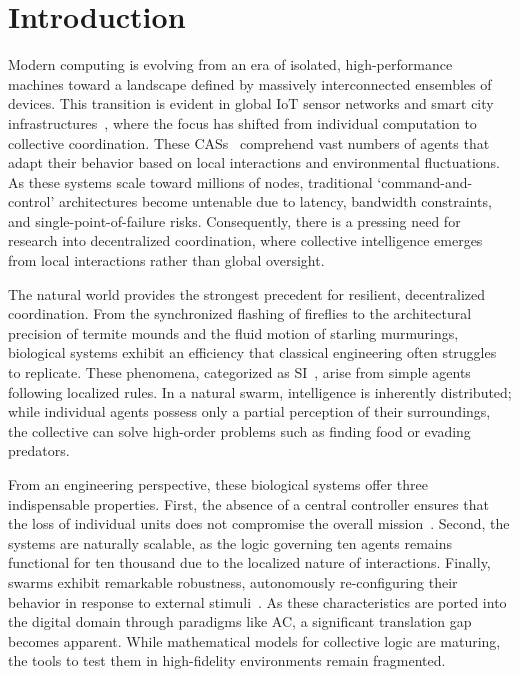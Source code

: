 \chapter{Introduction}

Modern computing is evolving from an era of isolated, high-performance machines toward a landscape defined by massively interconnected ensembles of devices. This transition is evident in global \ac{IoT} sensor networks and smart city infrastructures~\cite{DBLP:journals/internet/AguzziCPV22}, where the focus has shifted from individual computation to collective coordination. These \aclp{CAS}~\cite{DBLP:conf/birthday/BucchiaroneM19} comprehend vast numbers of agents that adapt their behavior based on local interactions and environmental fluctuations. As these systems scale toward millions of nodes, traditional `command-and-control' architectures become untenable due to latency, bandwidth constraints, and single-point-of-failure risks. Consequently, there is a pressing need for research into decentralized coordination, where collective intelligence emerges from local interactions rather than global oversight.

The natural world provides the strongest precedent for resilient, decentralized coordination. From the synchronized flashing of fireflies to the architectural precision of termite mounds and the fluid motion of starling murmurings, biological systems exhibit an efficiency that classical engineering often struggles to replicate. These phenomena, categorized as \ac{SI}~\cite{Bonabeau_Dorigo_Theraulaz_1999}, arise from simple agents following localized rules. In a natural swarm, intelligence is inherently distributed; while individual agents possess only a partial perception of their surroundings, the collective can solve high-order problems such as finding food or evading predators.

From an engineering perspective, these biological systems offer three indispensable properties. First, the absence of a central controller ensures that the loss of individual units does not compromise the overall mission~\cite[pp.~6-11]{Bonabeau_Dorigo_Theraulaz_1999}. Second, the systems are naturally scalable, as the logic governing ten agents remains functional for ten thousand due to the localized nature of interactions. Finally, swarms exhibit remarkable robustness, autonomously re-configuring their behavior in response to external stimuli~\cite[pp.~25-36]{Bonabeau_Dorigo_Theraulaz_1999}. As these characteristics are ported into the digital domain through paradigms like \acl{AC}, a significant translation gap becomes apparent. While mathematical models for collective logic are maturing, the tools to test them in high-fidelity environments remain fragmented.

